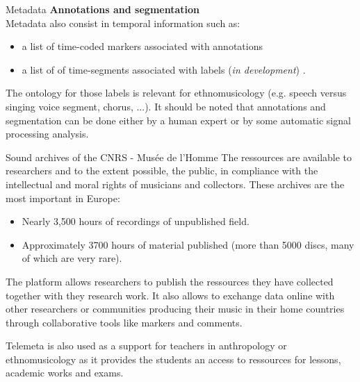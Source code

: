 \documentclass[final, hyperref, table]{beamer}
\begin{document}
\begin{frame}[containsverbatim]{}
\begin{columns}[T]
\begin{column}[T]{.49\linewidth}
\begin{block}{Metadata}
        \textbf{Annotations and segmentation}\\
        Metadata also consist in temporal information such as:
        \begin{itemize}
        \item a list of \alert{time-coded markers} associated with annotations
        \item a list of of \alert{time-segments} associated with labels (\emph{in development}) .
        \end{itemize}
        The ontology for those labels is relevant for ethnomusicology (e.g. speech versus singing voice segment, chorus, ...).
        It should be noted that annotations and segmentation can be done either by a human expert or by some automatic signal processing analysis.
      \end{block}
      
      \begin{block}{Sound archives of the CNRS - Musée de l'Homme}
        The ressources are available to researchers and to the extent possible, the public, in compliance with the intellectual and moral rights of musicians and collectors.
            These archives are the most important in Europe:
            \begin{itemize}
            \item Nearly 3,500 hours of recordings of unpublished field.
            \item Approximately 3700 hours of material published (more than
              5000 discs, many of which are very rare).
            \end{itemize}
            
            The platform allows researchers to publish the ressources they have collected together with they research work. It also allows to exchange data online with other researchers or communities producing their music in their home countries through collaborative tools like markers and comments.
            
            Telemeta is also used as a support for teachers in anthropology or ethnomusicology as it provides the students an access to ressources for lessons, academic works and exams.


\end{block}
\end{column}
\end{columns}
\end{frame}
\end{document}
